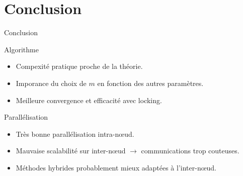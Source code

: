 \documentclass[9.5pt]{beamer}
\begin{document}
\section{Conclusion}
	\begin{frame}{Conclusion}
		\begin{block}{Algorithme}
			\begin{itemize}
				\item Compexité pratique proche de la théorie.
				\item Imporance du choix de $m$ en fonction des autres paramètres.
				\item Meilleure convergence et efficacité avec locking.
			\end{itemize}
		\end{block}

		\begin{block}{Parallélisation}
			\begin{itemize}
				\item Très bonne parallélisation intra-n\oe{}ud.
				\item Mauvaise scalabilité sur inter-n\oe{}ud $\rightarrow$ communications trop couteuses.
				\item Méthodes hybrides probablement mieux adaptées à l'inter-n\oe{}ud.
			\end{itemize}
		\end{block}
	\end{frame}
\end{document}
